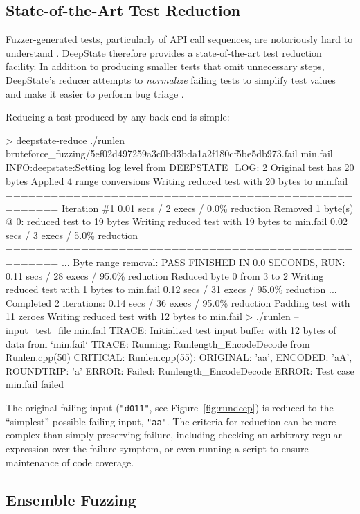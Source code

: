 \documentclass[sigconf]{acmart}
\begin{document}
\subsection{State-of-the-Art Test Reduction}

Fuzzer-generated tests, particularly of API call sequences, are notoriously hard to understand \cite{DD}.  DeepState therefore provides a state-of-the-art test reduction facility.  In addition to producing smaller tests that omit unnecessary steps, DeepState's reducer attempts to \emph{normalize} failing tests \cite{OneTest,MaciverD19} to simplify test values and make it easier to perform bug triage \cite{PLDI13}.

Reducing a test produced by any back-end is simple:

{\scriptsize
  \begin{code}
> deepstate-reduce ./runlen
  bruteforce\_fuzzing/5ef02d497259a3c0bd3bda1a2f180cf5be5db973.fail
  min.fail
INFO:deepstate:Setting log level from DEEPSTATE\_LOG: 2
Original test has 20 bytes
Applied 4 range conversions
Writing reduced test with 20 bytes to min.fail
=====================================================
Iteration \#1 0.01 secs / 2 execs / 0.0\% reduction
Removed 1 byte(s) @ 0: reduced test to 19 bytes
Writing reduced test with 19 bytes to min.fail
 0.02 secs / 3 execs / 5.0\% reduction
=====================================================
...
Byte range removal: PASS FINISHED IN 0.0 SECONDS, RUN: 0.11 secs / 28 execs /
  95.0\% reduction
Reduced byte 0 from 3 to 2
Writing reduced test with 1 bytes to min.fail
 0.12 secs / 31 execs / 95.0\% reduction
...
Completed 2 iterations: 0.14 secs / 36 execs / 95.0\% reduction
Padding test with 11 zeroes
Writing reduced test with 12 bytes to min.fail
> ./runlen --input\_test\_file min.fail
TRACE: Initialized test input buffer with 12 bytes of data from `min.fail`
TRACE: Running: Runlength\_EncodeDecode from Runlen.cpp(50)
CRITICAL: Runlen.cpp(55): ORIGINAL: 'aa', ENCODED: 'aA', ROUNDTRIP: 'a'
ERROR: Failed: Runlength\_EncodeDecode
ERROR: Test case min.fail failed
\end{code}
}

The original failing input ({\tt "d011"}, see Figure~\ref{fig:rundeep}) is reduced to the ``simplest'' possible failing input, {\tt "aa"}.  The criteria for reduction can be more complex than simply preserving failure, including checking an arbitrary regular expression over the failure symptom, or even running a script to ensure maintenance of code coverage.

\subsection{Ensemble Fuzzing}
\end{document}
